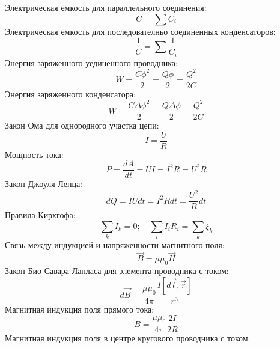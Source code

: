 \documentclass[twoside, a4paperpt, fleqn]{extarticle}
\begin{document}
Электрическая емкость для параллельного соединения:
\begin{equation*}
    C = \sum C_i
\end{equation*}
Электрическая емкость для последователньо соединенных конденсаторов:
\begin{equation*}
    \frac{1}{C} = \sum \frac{1}{C_i}
\end{equation*}
Энергия заряженного уединенного проводника:
\begin{equation*}
    W = \frac{C \phi^2}{2} = \frac{Q \phi} {2} = \frac{Q^2}{2 C}
\end{equation*}
Энергия заряженного конденсатора:
\begin{equation*}
    W = \frac{C \Delta \phi^2}{2} = \frac{Q \Delta \phi} {2} = \frac{Q^2}{2 C}
\end{equation*}
Закон Ома для однородного участка цепи:
\begin{equation*}
    I = \frac{U}{R}
\end{equation*}
Мощность тока:
\begin{equation*}
    P = \frac{d A}{d t} = U I = I^2 R = U^2 R
\end{equation*}
Закон Джоуля-Ленца:
\begin{equation*}
    d Q = I U dt = I^2 R dt = \frac{U^2}{R} dt
\end{equation*}
Правила Кирхгофа:
\begin{equation*}
    \sum_k I_k = 0; \quad \sum_i I_i R_i = \sum_k \xi_k
\end{equation*}
Связь между индукцией и напряженности магнитного поля:
\begin{equation*}
    \vec{B} = \mu \mu_0 \vec{H}
\end{equation*}
Закон Био-Савара-Лапласа для элемента проводника с током:
\begin{equation*}
    d \vec{B} = \frac{\mu \mu_0}{4 \pi} \frac{I [d \vec{l}, \vec{r}]}{r^3}
\end{equation*}
Магнитная индукция поля прямого тока:
\begin{equation*}
    B = \frac{\mu \mu_0}{4 \pi} \frac{2 I}{2 R}
\end{equation*}
Магнитная индукция поля в центре кругового проводника с током:
\end{document}
